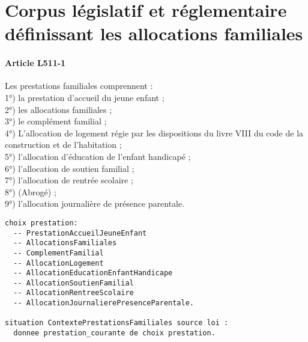 \documentclass[11pt, french]{article}
\begin{document}
\section{Corpus législatif et réglementaire définissant les allocations familiales}

\paragraph{Article L511-1} Les prestations familiales comprennent :\\
1°) la prestation d'accueil du jeune enfant ;\\
2°) les allocations familiales ;\\
3°) le complément familial ;\\
4°) L'allocation de logement régie par les dispositions du livre VIII du code de la construction et de l'habitation ;\\
5°) l'allocation d'éducation de l'enfant handicapé ;\\
6°) l'allocation de soutien familial ;\\
7°) l'allocation de rentrée scolaire ;\\
8°) (Abrogé) ;\\
9°) l'allocation journalière de présence parentale.
\begin{lstlisting}
choix prestation:
  -- PrestationAccueilJeuneEnfant
  -- AllocationsFamiliales
  -- ComplementFamilial
  -- AllocationLogement
  -- AllocationEducationEnfantHandicape
  -- AllocationSoutienFamilial
  -- AllocationRentreeScolaire
  -- AllocationJournalierePresenceParentale.

situation ContextePrestationsFamiliales source loi :
  donnee prestation_courante de choix prestation.
\end{lstlisting}
\end{document}
